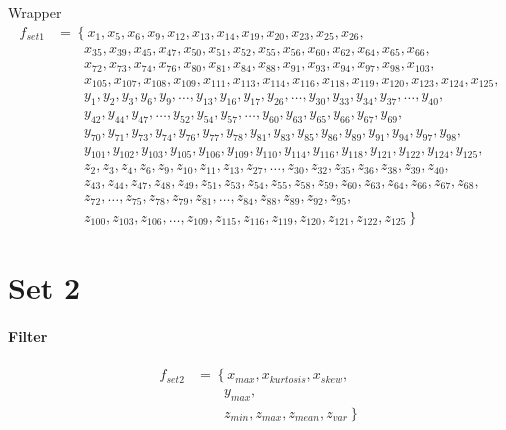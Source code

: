 \documentclass[USenglish]{ifimaster}  %
\begin{document}
Wrapper
\begin{align}
f_{set1} &= \left\{x_{1}, x_{5}, x_{6}, x_{9}, x_{12}, x_{13}, x_{14}, x_{19},x_{20},x_{23},x_{25},x_{26},  \right.\nonumber\\
&\qquad \left. {}  x_{35}, x_{39},x_{45},x_{47},x_{50},x_{51},x_{52},x_{55},x_{56},x_{60},x_{62},x_{64},x_{65},x_{66}, \right.\nonumber\\
&\qquad \left. {}  x_{72},x_{73},x_{74},x_{76},x_{80},x_{81},x_{84},x_{88},x_{91},x_{93},x_{94},x_{97},x_{98},x_{103}, \right.\nonumber\\
&\qquad \left. {}  x_{105},x_{107},x_{108},x_{109},x_{111},x_{113},x_{114},x_{116},x_{118},x_{119},x_{120},x_{123},x_{124},x_{125}, \right.\nonumber\\
&\qquad \left. {}  y_{1},y_{2},y_{3},y_{6},y_{9},\dotsc,y_{13},y_{16}, y_{17},y_{26},\dotsc,y_{30},y_{33}, y_{34},y_{37},\dotsc,y_{40}, \right.\nonumber\\
&\qquad \left. {}  y_{42}, y_{44}, y_{47},\dotsc, y_{52}, y_{54}, y_{57},\dotsc, y_{60}, y_{63}, y_{65}, y_{66}, y_{67}, y_{69}, \right.\nonumber\\
&\qquad \left. {}  y_{70}, y_{71}, y_{73}, y_{74}, y_{76}, y_{77}, y_{78}, y_{81}, y_{83}, y_{85}, y_{86}, y_{89}, y_{91}, y_{94}, y_{97}, y_{98}, \right.\nonumber\\
&\qquad \left. {}  y_{101}, y_{102}, y_{103}, y_{105}, y_{106}, y_{109}, y_{110}, y_{114}, y_{116}, y_{118}, y_{121}, y_{122}, y_{124}, y_{125}, \right.\nonumber\\
&\qquad \left. {}  z_{2}, z_{3}, z_{4}, z_{6}, z_{9}, z_{10}, z_{11}, z_{13},z_{27},\dotsc,z_{30},z_{32}, z_{35}, z_{36}, z_{38}, z_{39}, z_{40}, \right.\nonumber\\
&\qquad \left. {}  z_{43}, z_{44}, z_{47}, z_{48}, z_{49}, z_{51}, z_{53}, z_{54}, z_{55}, z_{58}, z_{59}, z_{60}, z_{63}, z_{64}, z_{66}, z_{67}, z_{68}, \right.\nonumber\\
&\qquad \left. {}  z_{72},\dotsc , z_{75}, z_{78}, z_{79}, z_{81},\dotsc, z_{84}, z_{88}, z_{89}, z_{92}, z_{95}, \right.\nonumber\\
&\qquad \left. {} z_{100}, z_{103}, z_{106},\dotsc ,z_{109}, z_{115}, z_{116}, z_{119}, z_{120}, z_{121}, z_{122}, z_{125}\right\}
\end{align}


\section{Set 2}
\paragraph{Filter}
\begin{align}
f_{set2} &= \left\{ x_{max}, x_{kurtosis}, x_{skew}, \right.\nonumber\\
&\qquad \left. {} y_{max}, \right.\nonumber\\
&\qquad \left. {} z_{min}, z_{max}, z_{mean}, z_{var} \right\}
\end{align}
\end{document}
